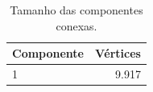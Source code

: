\begin{table}[ht]
\centering
\caption{Tamanho das componentes conexas.}
\label{tab:componentes}
\small
\begin{tabular}{lr}
\hline
Componente & Vértices \\
\hline
1 & 9.917 \\
\hline
\end{tabular}
\end{table}

